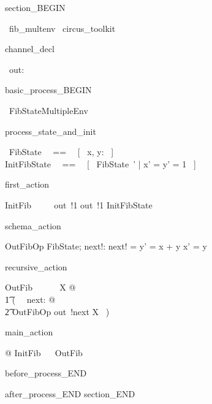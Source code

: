 section_BEGIN
\begin{zsection}
  \SECTION\ fib\_multenv \parents\ circus\_toolkit
\end{zsection}
channel_decl
\begin{circus}
    \circchannel\ out: \nat
\end{circus}
basic_process_BEGIN
\begin{circus}
    \circprocess\ FibStateMultipleEnv ~~\circdef~~ \circbegin
\end{circus}
process_state_and_init
\begin{circusaction}
    \circstate\ FibState ~~==~~ [~ x, y: \nat ~]  \land [ z: \nat ]\\
    InitFibState ~~==~~ [~ FibState~' | x' = y' = 1 ~]
\end{circusaction}
first_action
\begin{circusaction}
    InitFib ~~\circdef~~ out~!1 \then out~!1 \then InitFibState
\end{circusaction}
schema_action
\begin{schema}{OutFibOp}
    \Delta FibState; next!: \nat
\where
    next! = y' = x + y \land x' = y
\end{schema}
recursive_action
\begin{circusaction}
    OutFib ~~\circdef~~ \circmu\ X @ \\
    	\t1 (~ \circvar\ next: \nat @ \\
	   \t2 OutFibOp \circseq out~!next \then X ~)
\end{circusaction}
main_action
\begin{circusaction}
    @ InitFib ~\circseq~ OutFib
\end{circusaction}
before_process_END
\begin{circus}
    \circend
\end{circus}
after_process_END
section_END 